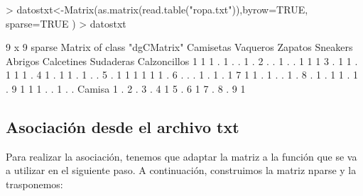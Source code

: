 \documentclass [a4paper] {article}
\begin{document}
\begin{Schunk}
\begin{Sinput}
> datostxt<-Matrix(as.matrix(read.table("ropa.txt")),byrow=TRUE, sparse=TRUE )
> datostxt
\end{Sinput}
\begin{Soutput}
9 x 9 sparse Matrix of class "dgCMatrix"
  Camisetas Vaqueros Zapatos Sneakers Abrigos Calcetines Sudaderas Calzoncillos
1         1        1       .        1       .          .         1            .
2         .        .       1        .       .          1         1            1
3         .        1       1        .       1          1         1            .
4         1        .       1        1       .          1         .            .
5         .        1       1        1       1          1         1            .
6         .        .       .        1       .          1         .            1
7         1        1       .        1       .          .         1            .
8         .        1       .        1       1          .         1            .
9         1        1       1        .       .          1         .            .
  Camisa
1      .
2      .
3      .
4      1
5      .
6      1
7      .
8      .
9      1
\end{Soutput}
\end{Schunk}

\subsection{Asociación desde el archivo txt}
Para realizar la asociación, tenemos que adaptar la matriz a la función
que se va a utilizar en el siguiente paso. A continuación, construimos la matriz nparse
y la trasponemos:
\end{document}
